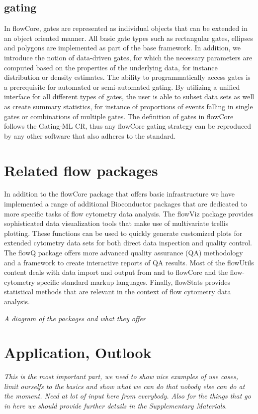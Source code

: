 \documentclass[12pt]{article}
\begin{document}
\subsection{gating}
In flowCore, gates are represented as individual objects that can be
extended in an object oriented manner. All basic gate types such as
rectangular gates, ellipses and polygons are implemented as part of
the base framework. In addition, we introduce the notion of
data-driven gates, for which the necessary parameters are computed
based on the properties of the underlying data, for instance
distribution or density estimates. The ability to programmatically
access gates is a prerequisite for automated or semi-automated
gating. By utilizing a unified interface for all different types of
gates, the user is able to subset data sets as well as create summary
statistics, for instance of proportions of events falling in single
gates or combinations of multiple gates. The definition of gates in
flowCore follows the Gating-ML CR, thus any flowCore
gating strategy can be reproduced by any other software that also
adheres to the standard.

\section{Related flow packages}
In addition to the flowCore package that offers basic infrastructure
we have implemented a range of additional Bioconductor packages that
are dedicated to more specific tasks of flow cytometry data
analysis. The flowViz package provides sophisticated data
visualization tools that make use of multivariate trellis
plotting. These functions can be used to quickly generate customized
plots for extended cytometry data sets for both direct data inspection
and quality control. The flowQ package offers more advanced quality
assurance (QA) methodology and a framework to create interactive
reports of QA results. Most of the flowUtils content deals with data
import and output from and to flowCore and the flow-cytometry specific
standard markup languages. Finally, flowStats provides statistical
methods that are relevant in the context of flow cytometry data
analysis.

\textit{A diagram of the packages and what they offer}

\section{Application, Outlook}
\textit{This is the most important part, we need to show nice examples
  of use cases, limit ourselfs to the basics and show what we can do
  that nobody else can do at the moment. Need at lot of input here
  from everybody. Also for the things that go in here we should
  provide further details in the Supplementary Materials.}

  
 
\end{document}
